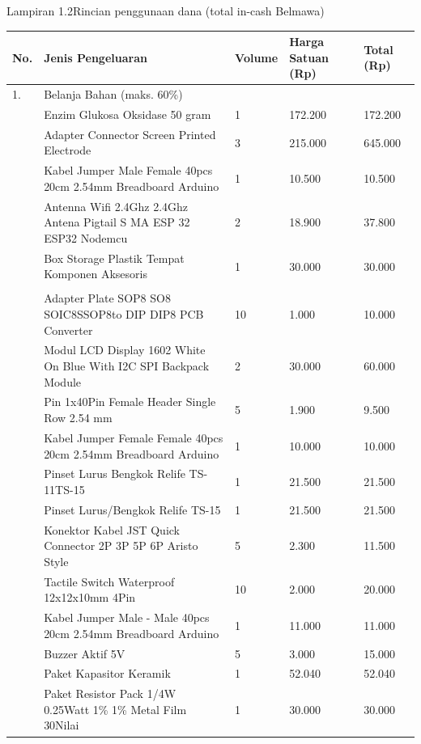 \documentclass[a4paper,12pt]{article}
\begin{document}
  Lampiran 1.2Rincian penggunaan dana (total in-cash Belmawa)

\begin{longtable}{|p{}|p{}|p{}|p{}|p{}|}
\hline
No. & Jenis Pengeluaran & Volume & Harga Satuan (Rp) & Total (Rp) \\
\hline
1. & Belanja Bahan (maks. 60\%) &  &  &  \\
\hline
 & Enzim Glukosa Oksidase 50 gram & 1 & 172.200 & 172.200 \\
\hline
 & Adapter Connector Screen Printed Electrode & 3 & 215.000 & 645.000 \\
\hline
 & Kabel Jumper Male Female 40pcs 20cm 2.54mm Breadboard Arduino & 1 & 10.500 & 10.500 \\
\hline
 & Antenna Wifi 2.4Ghz 2.4Ghz Antena Pigtail S MA ESP 32 ESP32 Nodemcu & 2 & 18.900 & 37.800 \\
\hline
 & Box Storage Plastik Tempat Komponen Aksesoris & 1 & 30.000 & 30.000 \\
\hline
 &  &  &  &  \\
\hline
 & Adapter Plate SOP8 SO8 SOIC8SSOP8to DIP DIP8 PCB Converter & 10 & 1.000 & 10.000 \\
\hline
 & Modul LCD Display 1602 White On Blue With I2C SPI Backpack Module & 2 & 30.000 & 60.000 \\
\hline
 & Pin 1x40Pin Female Header Single Row 2.54 mm & 5 & 1.900 & 9.500 \\
\hline
 & Kabel Jumper Female Female 40pcs 20cm 2.54mm Breadboard Arduino & 1 & 10.000 & 10.000 \\
\hline
 & Pinset Lurus Bengkok Relife TS-11TS-15 & 1 & 21.500 & 21.500 \\
\hline
 & Pinset Lurus/Bengkok Relife TS-15 & 1 & 21.500 & 21.500 \\
\hline
 & Konektor Kabel JST Quick Connector 2P 3P 5P 6P Aristo Style & 5 & 2.300 & 11.500 \\
\hline
 & Tactile Switch Waterproof 12x12x10mm 4Pin & 10 & 2.000 & 20.000 \\
\hline
 & Kabel Jumper Male - Male 40pcs 20cm 2.54mm Breadboard Arduino & 1 & 11.000 & 11.000 \\
\hline
 & Buzzer Aktif 5V & 5 & 3.000 & 15.000 \\
\hline
 & Paket Kapasitor Keramik & 1 & 52.040 & 52.040 \\
\hline
 & Paket Resistor Pack 1/4W 0.25Watt 1\% 1\% Metal Film 30Nilai & 1 & 30.000 & 30.000 \\

\end{longtable}
\end{document}
